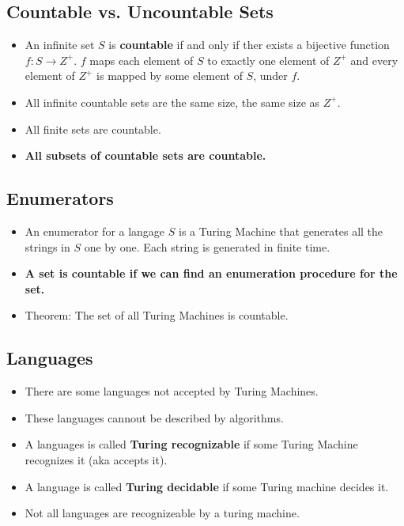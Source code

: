\documentclass[a4paper]{article}
\begin{document}
\begin{multicols}{2}
	\subsection{Countable vs. Uncountable Sets}
	\begin{itemize}
		\item An infinite set $S$ is \textbf{countable} if and only if ther exists a
					bijective function $f: S \rightarrow Z^+$. $f$ maps each element of
					$S$ to exactly one element of $Z^+$ and every element of $Z^+$ is
					mapped by some element of $S$, under $f$.
		\item All infinite countable sets are the same size, the same size as $Z^+$.
		\item All finite sets are countable.
		\item \textbf{All subsets of countable sets are countable.}
	\end{itemize}
	\subsection{Enumerators}
	\begin{itemize}
		\item An enumerator for a langage $S$ is a Turing Machine that generates
					all the strings in $S$ one by one. Each string is generated in finite
					time.
		\item \textbf{A set is countable if we can find an enumeration procedure for
					the set.}
		\item Theorem: The set of all Turing Machines is countable.
	\end{itemize}
	\subsection{Languages}
	\begin{itemize}
		\item There are some languages not accepted by Turing Machines.
		\item These languages cannout be described by algorithms.
		\item A languages is called \textbf{Turing recognizable} if some Turing
					Machine recognizes it (aka accepts it).
		\item A language is called \textbf{Turing decidable} if some Turing machine
					decides it.
		\item Not all languages are recognizeable by a turing machine.
	\end{itemize}


\end{multicols}
\end{document}

